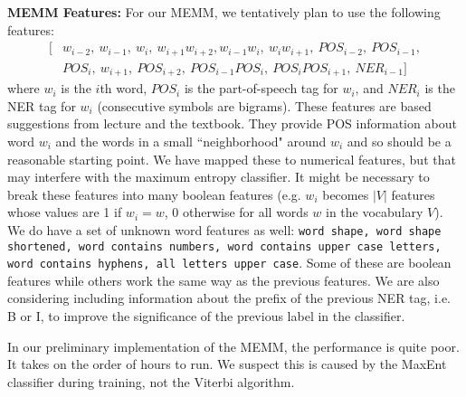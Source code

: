 \documentclass[12pt]{article}
\begin{document}
\textbf{MEMM Features:}
For our MEMM, we tentatively plan to use the following features:
\begin{equation*}
\begin{split}
[&w_{i - 2},\ w_{i - 1},\ w_i,\ w_{i + 1}w_{i + 2},
w_{i - 1}w_i,\ w_iw_{i + 1},\ POS_{i - 2},\ POS_{i - 1},\\ &POS_i,\ w_{i + 1},\ POS_{i + 2}, \ POS_{i - 1}POS_i,\ POS_iPOS_{i + 1},\ NER_{i - 1}]
\end{split}
\end{equation*}
where $w_i$ is the $i$th word, $POS_i$ is the part-of-speech tag for $w_i$, and $NER_i$ is the NER tag for $w_i$ (consecutive symbols are bigrams). These features are based suggestions from lecture and the textbook. They provide POS information about word $w_i$ and the words in a small ``neighborhood" around $w_i$ and so should be a reasonable starting point. We have mapped these to numerical features, but that may interfere with the maximum entropy classifier. It might be necessary to break these features into many boolean features (e.g. $w_i$ becomes $|V|$ features whose values are 1 if $w_i = w$, 0 otherwise for all words $w$ in the vocabulary $V$). We do have a set of unknown word features as well:
{\tt word shape, word shape shortened, word contains numbers, word contains upper case letters, word contains hyphens, all letters upper case}. Some of these are boolean features while others work the same way as the previous features. We are also considering including information about the prefix of the previous NER tag, i.e. B or I, to improve the significance of the previous label in the classifier.

In our preliminary implementation of the MEMM, the performance is quite poor. It takes on the order of hours to run. We suspect this is caused by the MaxEnt classifier during training, not the Viterbi algorithm.
\end{document}
